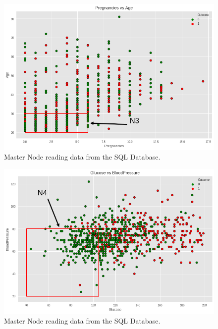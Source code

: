 \documentclass[12pt]{article}
\begin{document}
\begin{figure}[ht]
\centering
\includegraphics[width=1\textwidth]{download(2).png}
\caption{Master Node reading data from the SQL Database.}
\end{figure}

\begin{figure}[ht]
\centering
\includegraphics[width=1\textwidth]{download(3).png}
\caption{Master Node reading data from the SQL Database.}
\end{figure}
\end{document}
